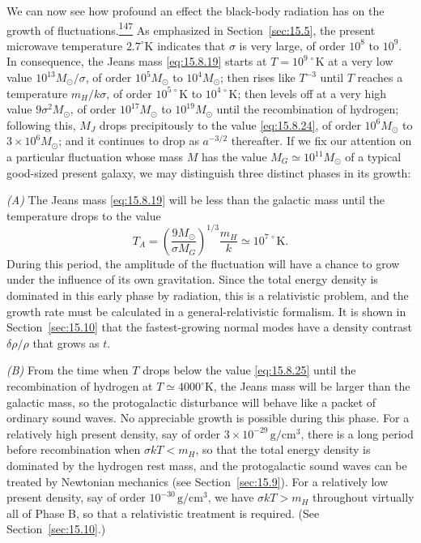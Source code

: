 We can now see how profound an effect the black-body radiation has on the
growth of fluctuations.\hyperref[ch15-ref-147]{\textsuperscript{147}} As
emphasized in Section~\ref{sec:15.5}, the present microwave temperature
\(2.7^\circ\mathrm K\) indicates that \(\sigma\) is very large, of order
\(10^8\) to \(10^9\). In consequence, the Jeans mass \eqref{eq:15.8.19}
starts at \(T=10^{9\,\circ}\mathrm K\) at a very low value
\(10^{13}M_\odot/\sigma\), of order \(10^5M_\odot\) to \(10^4M_\odot\);
then rises like \(T^{-3}\) until \(T\) reaches a temperature
\(m_H/k\sigma\), of order \(10^{5\,\circ}\mathrm K\) to
\(10^{4\,\circ}\mathrm K\); then levels off at a very high value
\(9\sigma^2M_\odot\), of order \(10^{17}M_\odot\) to \(10^{19}M_\odot\)
until the recombination of hydrogen; following this, \(M_J\) drops
precipitously to the value \eqref{eq:15.8.24}, of order \(10^6M_\odot\) to
\(3\times10^6M_\odot\); and it continues to drop as \(a^{-3/2}\)
thereafter. If we fix our attention on a particular fluctuation whose mass
\(M\) has the value \(M_G\simeq10^{11}M_\odot\) of a typical good-sized
present galaxy, we may distinguish three distinct phases in its growth:

\emph{(A)} The Jeans mass \eqref{eq:15.8.19} will be less than the galactic
mass until the temperature drops to the value
\begin{equation}
  T_A
  =
  \left(
    \frac{9M_\odot}{\sigma M_G}
  \right)^{1/3}
  \frac{m_H}{k}
  \simeq
  10^{7\,\circ}\mathrm K.
  \tag{15.8.25}\label{eq:15.8.25}
\end{equation}
During this period, the amplitude of the fluctuation will have a chance to
grow under the influence of its own gravitation. Since the total energy
density is dominated in this early phase by radiation, this is a relativistic
problem, and the growth rate must be calculated in a general-relativistic
formalism. It is shown in Section~\ref{sec:15.10} that the fastest-growing
normal modes have a density contrast \(\delta\rho/\rho\) that grows as \(t\).

\emph{(B)} From the time when \(T\) drops below the value
\eqref{eq:15.8.25} until the recombination of hydrogen at
\(T\simeq4000^\circ\mathrm K\), the Jeans mass will be larger than the
galactic mass, so the protogalactic disturbance will behave like a packet of
ordinary sound waves. No appreciable growth is possible during this phase.
For a relatively high present density, say of order
\(3\times10^{-29}\,\mathrm{g/cm^3}\), there is a long period before
recombination when \(\sigma kT<m_H\), so that the total energy density is
dominated by the hydrogen rest mass, and the protogalactic sound waves can be
treated by Newtonian mechanics (see Section~\ref{sec:15.9}). For a relatively
low present density, say of order \(10^{-30}\,\mathrm{g/cm^3}\), we have
\(\sigma kT>m_H\) throughout virtually all of Phase B, so that a relativistic
treatment is required. (See Section~\ref{sec:15.10}.)


